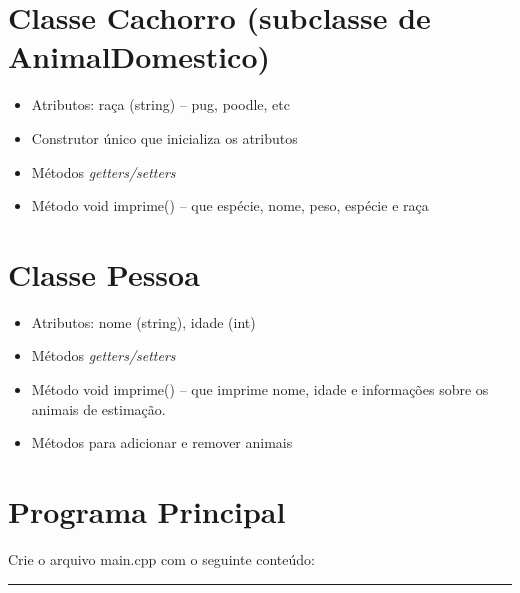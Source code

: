 \documentclass[12pt]{article}
\begin{document}
\section*{Classe {\sf Cachorro} (subclasse de {\sf AnimalDomestico})}

\begin{itemize}

\item Atributos: raça ({\sf string}) -- pug, poodle, etc

\item Construtor único que inicializa os atributos

\item Métodos {\it getters/setters}

\item Método {\sf void imprime()} -- que espécie, nome, peso, espécie e raça

\end{itemize}

\section*{Classe {\sf Pessoa}}

\begin{itemize}

\item Atributos: nome ({\sf string}), idade ({\sf int})
       
\item Métodos {\it getters/setters}

\item Método {\sf void imprime()} -- que imprime nome, idade e informações sobre os animais de estimação.

\item Métodos para adicionar e remover animais

\end{itemize}

\section*{Programa Principal}

Crie o arquivo {\sf main.cpp} com o seguinte conteúdo:

\par\noindent\rule{\textwidth}{0.4pt}
\end{document}
